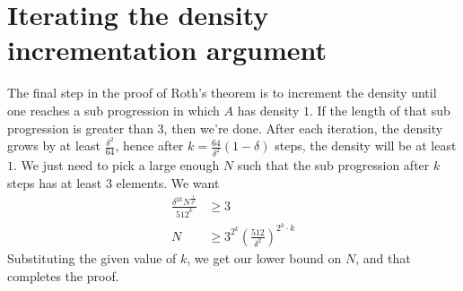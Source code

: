 \documentclass[12pt]{article}
\theoremstyle{definition}
\begin{document}
\section{Iterating the density incrementation argument}
The final step in the proof of Roth's theorem is to increment the density until one reaches a sub progression in which $A$ has density $1$. If the length of that sub progression is greater than $3$, then we're done. After each iteration, the density grows by at least $\frac{\delta^2}{64}$, hence after $k = \frac{64}{\delta^2} \left( 1 - \delta \right)$ steps, the density will be at least $1$. We just need to pick a large enough $N$ such that the sub progression after $k$ steps has at least $3$ elements. We want
\begin{align*}
    \frac{\delta^{2k} N^{\frac{1}{2^k}}}{512^k} &\geq 3 \\
    N &\geq 3^{2^k} \left( \frac{512}{\delta^2} \right)^{2^k \cdot k}
\end{align*} 
Substituting the given value of $k$, we get our lower bound on $N$, and that completes the proof.



\end{document}
